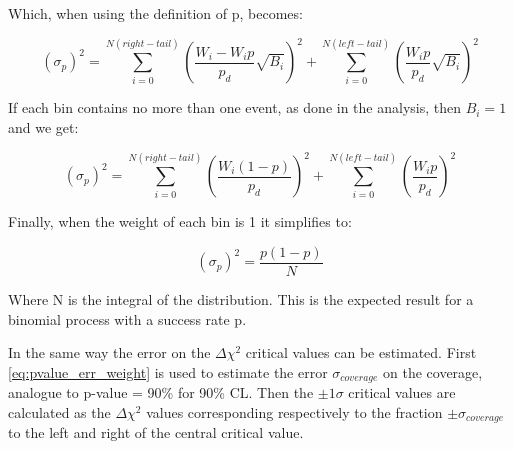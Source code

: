 Which, when using the definition of p, becomes:

\begin{equation}
(\sigma_p)^2 =  \sum^{N (right-tail)}_{i=0}(\frac{ W_i  - W_i p}{p_d} \sqrt{B_i})^2 +  \sum^{N (left-tail)}_{i=0}(\frac{ W_i p}{p_d} \sqrt{B_i} )^2
\label{eq:pvalue_err_weight}
\end{equation}

If each bin contains no more than one event, as done in the analysis, then $B_i = 1$ and we get:

\begin{equation}
(\sigma_p)^2 =  \sum^{N (right-tail)}_{i=0} \left( \frac{ W_i  (1 - p)}{p_d} \right)^2 +  \sum^{N (left-tail)}_{i=0} \left(\frac{ W_i p}{p_d} \right)^2
\label{eq:pvalue_err_weight_event}
\end{equation}

Finally, when the weight of each bin is 1 it simplifies to:

\begin{equation}
(\sigma_p)^2 = \frac{p(1-p)}{N}
\end{equation}

Where N is the integral of the distribution. This is the expected result for a binomial process with a success rate p. 

In the same way the error on the $\Delta \chi^2$ critical values can be estimated. 
First \cref{eq:pvalue_err_weight} is used to estimate the error $\sigma_{coverage}$ on the coverage, analogue to p-value = 90\% for 90\% CL.
Then the $\pm 1 \sigma$ critical values are calculated as the $\Delta \chi^2$ values corresponding
respectively to the fraction $\pm \sigma_{coverage}$ to the left and right of the central critical value.   





